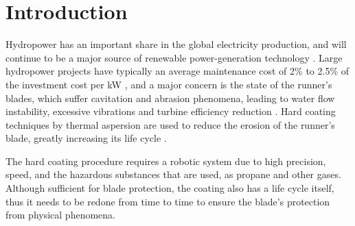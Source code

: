 \section{Introduction}

Hydropower has an important share in the global electricity production, and
will continue to be a major source of renewable power-generation technology
\cite{iea}. Large hydropower projects have typically an average maintenance
cost of 2\% to 2.5\% of the investment cost per kW \cite{irena}, and a major
concern is the state of the runner's blades, which suffer cavitation and
abrasion phenomena, leading to water flow instability, excessive vibrations and
turbine efficiency reduction \cite{goldemberg2007energia}. Hard coating
techniques by thermal aspersion are used to reduce the erosion of the runner's
blade, greatly increasing its life cycle \cite{krella2011new}. 

The hard coating procedure requires a robotic system due to high precision,
speed, and the hazardous substances that are used, as propane and other gases.
Although sufficient for blade protection, the coating also has a life
cycle itself, thus it needs to be redone from time to time to ensure the
blade's protection from physical phenomena.


